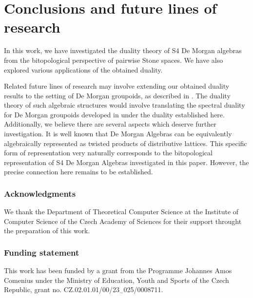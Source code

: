 \documentclass{amsart}
\theoremstyle{plain}
\theoremstyle{definition}
\begin{document}
\section{Conclusions and future lines of research}
In this work, we have investigated the duality theory of S4 De Morgan algebras from the bitopological perspective of pairwise Stone spaces. We have also explored various applications of the obtained duality. 

Related future lines of research may involve extending our obtained duality results to the setting of De Morgan groupoids, as described in \cite{mcdonald}. The duality theory of such algebraic structures would involve translating the spectral duality for De Morgan groupoids developed in \cite{mcdonald} under the duality established here. Additionally, we believe there are several aspects which deserve further investigation. It is well known that De Morgan Algebras can be equivalently algebraically represented as twisted products of distributive lattices. This specific form of representation very naturally corresponds to the bitopological representation of S4 De Morgan Algebras investigated in this paper. However, the precise connection here remains to be established.










\subsubsection*{Acknowledgments}
We thank the Department of Theoretical Computer Science at the Institute of Computer Science of the Czech Academy of Sciences for their support throught the preparation of this work. 

\subsubsection*{Funding statement}
This work has been funded by a grant from the Programme Johannes Amos Comenius
under the Ministry of Education, Youth and Sports of the Czech Republic, grant no.
CZ.02.01.01/00/23$_{-}$025/0008711.
\end{document}
